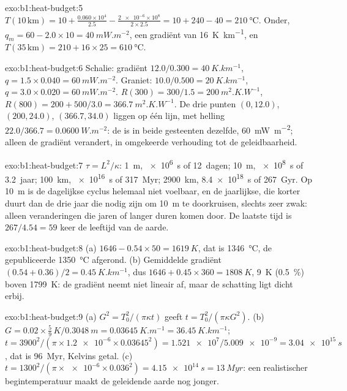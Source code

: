 \begin{solution}{exo:b1:heat-budget:5}
$T(10\,\text{km}) = 10 + \frac{0.060\times10^4}{2.5} - \frac{\num{2e-6}\times10^8}{2\times2.5}
= 10 + 240 - 40 = \qty{210}{\degreeCelsius}$. Onder, $q_m = 60 - 2.0\times10 =
\qty{40}{mW.m^{-2}}$, een gradiënt van \qty{16}{K.km^{-1}}, en
$T(35\,\text{km}) = 210 + 16\times25 = \qty{610}{\degreeCelsius}$.
\end{solution}

\begin{solution}{exo:b1:heat-budget:6}
Schalie: gradiënt $12.0/0.300 = \qty{40}{K.km^{-1}}$, $q = 1.5\times0.040 =
\qty{60}{mW.m^{-2}}$. Graniet: $10.0/0.500 = \qty{20}{K.km^{-1}}$,
$q = 3.0\times0.020 = \qty{60}{mW.m^{-2}}$. $R(300) = 300/1.5 =
\qty{200}{m^2.K.W^{-1}}$, $R(800) = 200 + 500/3.0 = \qty{366.7}{m^2.K.W^{-1}}$.
De drie punten $(0, 12.0)$, $(200, 24.0)$, $(366.7, 34.0)$ liggen op één lijn, met
helling $22.0/366.7 = \qty{0.0600}{W.m^{-2}}$: de  is in beide gesteenten dezelfde,
\qty{60}{mW.m^{-2}}; alleen de gradiënt verandert, in omgekeerde
verhouding tot de geleidbaarheid.
\end{solution}

\begin{solution}{exo:b1:heat-budget:7}
$\tau = L^2/\kappa$: \qty{1}{m}, \qty{e6}{s} of \num{12}~dagen; \qty{10}{m},
\qty{e8}{s} of \num{3.2}~jaar; \qty{100}{km}, \qty{e16}{s} of
\qty{317}{Myr}; \qty{2900}{km}, \qty{8.4e18}{s} of \qty{267}{Gyr}. Op
\qty{10}{m} is de dagelijkse cyclus helemaal niet voelbaar, en de jaarlijkse, die korter duurt dan de drie jaar die nodig zijn om \qty{10}{m} te doorkruisen, slechts zeer zwak: alleen veranderingen die jaren of langer duren komen door. De laatste tijd is $267/4.54 = 59$ keer de leeftijd van de aarde.
\end{solution}

\begin{solution}{exo:b1:heat-budget:8}
(a) $1646 - 0.54\times50 = \qty{1619}{K}$, dat is \qty{1346}{\degreeCelsius},
de gepubliceerde \qty{1350}{\degreeCelsius} afgerond. (b) Gemiddelde gradiënt
$(0.54 + 0.36)/2 = \qty{0.45}{K.km^{-1}}$, dus $1646 + 0.45\times360 =
\qty{1808}{K}$, \qty{9}{K} (\qty{0.5}{\percent}) boven \qty{1799}{K}: de gradiënt neemt niet lineair af, maar de schatting ligt dicht erbij.
\end{solution}

\begin{solution}{exo:b1:heat-budget:9}
(a) $G^2 = T_0^2/(\pi\kappa t)$ geeft $t = T_0^2/(\pi\kappa G^2)$.
(b) $G = 0.02\times\tfrac59\,\unit{K}/\qty{0.3048}{m} = \qty{0.03645}{K.m^{-1}} =
\qty{36.45}{K.km^{-1}}$; $t = 3900^2/(\pi\times\num{1.2e-6}\times0.03645^2) =
\num{1.521e7}/\num{5.009e-9} = \qty{3.04e15}{s}$, dat is \qty{96}{Myr},
Kelvins getal. (c) $t = 1300^2/(\pi\times\num{e-6}\times0.036^2) =
\qty{4.15e14}{s} = \qty{13}{Myr}$: een realistischer begintemperatuur maakt de geleidende aarde nog jonger.
\end{solution}

